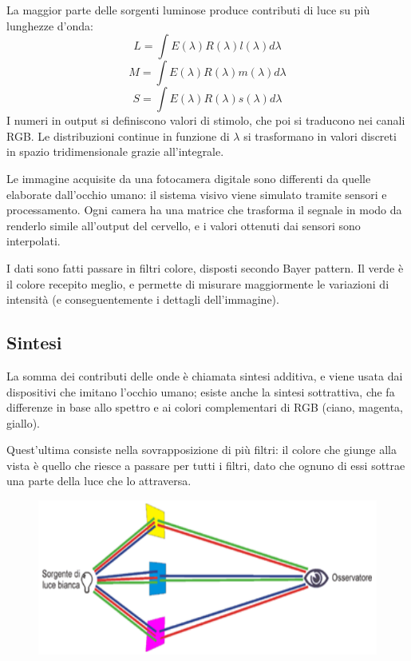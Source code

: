 La maggior parte delle sorgenti luminose produce contributi di luce su più lunghezze d'onda:
$$L = \int E(\lambda) R(\lambda) l(\lambda) d\lambda$$
$$M = \int E(\lambda) R(\lambda) m(\lambda) d\lambda$$
$$S = \int E(\lambda) R(\lambda) s(\lambda) d\lambda$$
I numeri in output si definiscono valori di stimolo, che poi si traducono nei canali RGB. Le distribuzioni continue in funzione di $\lambda$ si trasformano in valori discreti in spazio tridimensionale grazie all'integrale.

Le immagine acquisite da una fotocamera digitale sono differenti da quelle elaborate dall'occhio umano: il sistema visivo viene simulato tramite sensori e processamento. Ogni camera ha una matrice che trasforma il segnale in modo da renderlo simile all'output del cervello, e i valori ottenuti dai sensori sono interpolati. 

I dati sono fatti passare in filtri colore, disposti secondo Bayer pattern. Il verde è il colore recepito meglio, e permette di misurare maggiormente le variazioni di intensità (e conseguentemente i dettagli dell'immagine). 

\subsection{Sintesi}
La somma dei contributi delle onde è chiamata sintesi additiva, e viene usata dai dispositivi che imitano l'occhio umano; esiste anche la sintesi sottrattiva, che fa differenze in base allo spettro e ai colori complementari di RGB (ciano, magenta, giallo). 

Quest'ultima consiste nella sovrapposizione di più filtri: il colore che giunge alla vista è quello che riesce a passare per tutti i filtri, dato che ognuno di essi sottrae una parte della luce che lo attraversa. 

\begin{figure}[h]
	\centering
	\includegraphics[scale=0.6]{Lezioni/Immagini/occhio}
\end{figure}


